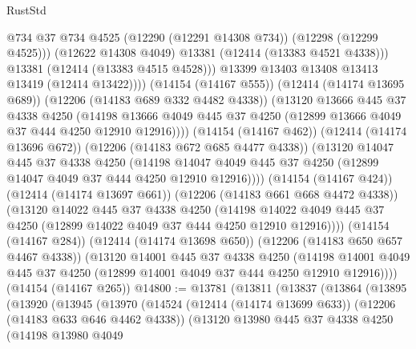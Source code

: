 \begin{lexlean}{RustStd}
\begin{coremodule}
{\begin{coremodule}
{{{{{{{{{{{{{{{{{{{{{{{{{{{{{{{{{{{{{{{{{{{{{{{{{{                        @734
                        @37
                        @734
                        @4525
                        (@12290 (@12291 @14308 @734))
                        (@12298 (@12299 @4525)))
                      (@12622 @14308 @4049)
                      @13381
                      (@12414 (@13383 @4521 @4338)))
                    @13381
                    (@12414 (@13383 @4515 @4528)))
                  @13399
                  @13403
                  @13408
                  @13413
                  @13419
                  (@12414 @13422))))
            (@14154 (@14167 @555))
            (@12414 (@14174 @13695 @689))
            (@12206 (@14183 @689 @332 @4482 @4338))
            (@13120
              @13666
              @445
              @37
              @4338
              @4250
              (@14198
                @13666
                @4049
                @445
                @37
                @4250
                (@12899 @13666 @4049 @37 @444 @4250 @12910 @12916))))
          (@14154 (@14167 @462))
          (@12414 (@14174 @13696 @672))
          (@12206 (@14183 @672 @685 @4477 @4338))
          (@13120
            @14047
            @445
            @37
            @4338
            @4250
            (@14198
              @14047
              @4049
              @445
              @37
              @4250
              (@12899 @14047 @4049 @37 @444 @4250 @12910 @12916))))
        (@14154 (@14167 @424))
        (@12414 (@14174 @13697 @661))
        (@12206 (@14183 @661 @668 @4472 @4338))
        (@13120
          @14022
          @445
          @37
          @4338
          @4250
          (@14198 @14022 @4049 @445 @37 @4250 (@12899 @14022 @4049 @37 @444 @4250 @12910 @12916))))
      (@14154 (@14167 @284))
      (@12414 (@14174 @13698 @650))
      (@12206 (@14183 @650 @657 @4467 @4338))
      (@13120
        @14001
        @445
        @37
        @4338
        @4250
        (@14198 @14001 @4049 @445 @37 @4250 (@12899 @14001 @4049 @37 @444 @4250 @12910 @12916))))
    (@14154 (@14167 @265))
@14800 := @13781
    (@13811
      (@13837
        (@13864
          (@13895
            (@13920
              (@13945
                (@13970
                  (@14524
                    (@12414 (@14174 @13699 @633))
                    (@12206 (@14183 @633 @646 @4462 @4338))
                    (@13120
                      @13980
                      @445
                      @37
                      @4338
                      @4250
                      (@14198
                        @13980
                        @4049
}}}}}}}}}}}}}}}}}}}}}}}}}}}}}}}}}}}}}}}}}}}}}}}}}}
\end{coremodule}}
\end{coremodule}
\end{lexlean}
